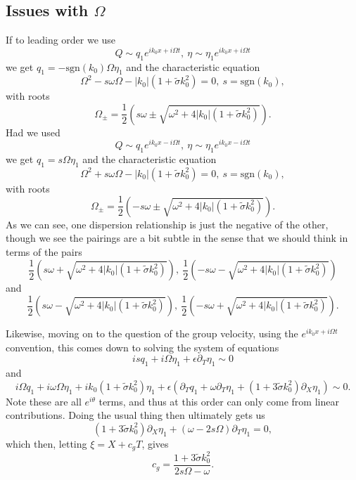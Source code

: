 \documentclass[a4paper,11pt]{article}
\newcommand{\p}{\partial}
\begin{document}
\subsection*{Issues with $\Omega$}
If to leading order we use 
\[
Q \sim q_{1}e^{ik_{0}x + i\Omega t}, ~ \eta \sim \eta_{1}e^{ik_{0}x + i\Omega t}
\]
we get $q_{1}=-\mbox{sgn}(k_{0})\Omega \eta_{1}$ and the characteristic equation 
\[
\Omega^{2} -s \omega \Omega - |k_{0}|(1+\tilde{\sigma}k_{0}^{2}) = 0, ~ s = \mbox{sgn}(k_{0}),
\]
with roots 
\[
\Omega_{\pm} = \frac{1}{2}\left(s\omega \pm \sqrt{\omega^{2} + 4|k_{0}|(1+\tilde{\sigma}k_{0}^{2})} \right).
\]
Had we used 
\[
Q \sim q_{1}e^{ik_{0}x - i\Omega t}, ~ \eta \sim \eta_{1}e^{ik_{0}x - i\Omega t}
\]
we get $q_{1}=s\Omega \eta_{1}$ and the characteristic equation 
\[
\Omega^{2} + s \omega \Omega - |k_{0}|(1+\tilde{\sigma}k_{0}^{2}) = 0, ~ s = \mbox{sgn}(k_{0}),
\]
with roots 
\[
\Omega_{\pm} = \frac{1}{2}\left(-s\omega \pm \sqrt{\omega^{2} + 4|k_{0}|(1+\tilde{\sigma}k_{0}^{2})} \right).
\]
As we can see, one dispersion relationship is just the negative of the other, though we see the pairings are a bit subtle in the sense that we should think in terms of the pairs
\[
\frac{1}{2}\left(s\omega + \sqrt{\omega^{2} + 4|k_{0}|(1+\tilde{\sigma}k_{0}^{2})} \right), ~ \frac{1}{2}\left(-s\omega - \sqrt{\omega^{2} + 4|k_{0}|(1+\tilde{\sigma}k_{0}^{2})} \right)
\]
and
\[
\frac{1}{2}\left(s\omega - \sqrt{\omega^{2} + 4|k_{0}|(1+\tilde{\sigma}k_{0}^{2})} \right), ~ \frac{1}{2}\left(-s\omega + \sqrt{\omega^{2} + 4|k_{0}|(1+\tilde{\sigma}k_{0}^{2})} \right).
\]

Likewise, moving on to the question of the group velocity, using the $e^{ik_{0}x+i\Omega t}$ convention, this comes down to solving the system of equations
\[
is q_{1} + i\Omega \eta_{1} + \epsilon \p_{T}\eta_{1} \sim 0
\]
and
\[
i\Omega q_{1} + i\omega \Omega \eta_{1} + ik_{0}(1+\tilde{\sigma}k_{0}^{2})\eta_{1} + \epsilon\left(\p_{T}q_{1} + \omega\p_{T}\eta_{1} + (1+3\tilde{\sigma}k_{0}^{2})\p_{X}\eta_{1} \right) \sim 0.
\]
Note these are all $e^{i\theta}$ terms, and thus at this order can only come from linear contributions.  Doing the usual thing then ultimately gets us 
\[
(1+3\tilde{\sigma}k_{0}^{2})\p_{X}\eta_{1} + (\omega-2s\Omega)\p_{T}\eta_{1} = 0, 
\]
which then, letting $\xi = X + c_{g}T$, gives 
\[
c_{g} = \frac{1+3\tilde{\sigma}k_{0}^{2}}{2s\Omega - \omega}.
\]
\end{document}
